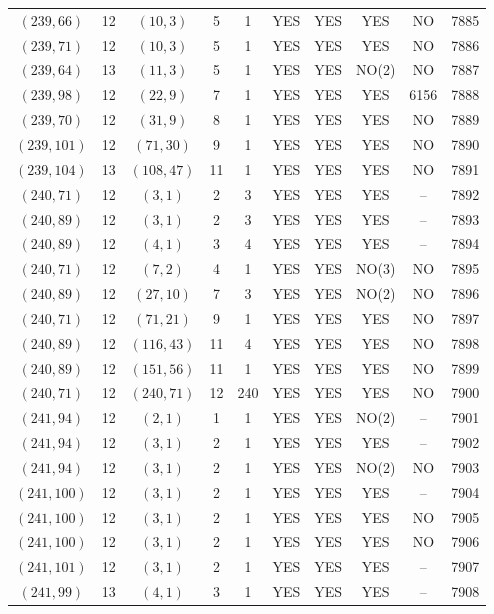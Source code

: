 \begin{longtable}{|c|c|c|c|c|c|c|c|c|c|}
$(239, 66)$ & 12 & $(10, 3)$ & 5 & 1 & YES & YES & YES & NO & 7885\\
$(239, 71)$ & 12 & $(10, 3)$ & 5 & 1 & YES & YES & YES & NO & 7886\\
$(239, 64)$ & 13 & $(11, 3)$ & 5 & 1 & YES & YES & NO(2) & NO & 7887\\
$(239, 98)$ & 12 & $(22, 9)$ & 7 & 1 & YES & YES & YES & 6156 & 7888\\
$(239, 70)$ & 12 & $(31, 9)$ & 8 & 1 & YES & YES & YES & NO & 7889\\
$(239, 101)$ & 12 & $(71, 30)$ & 9 & 1 & YES & YES & YES & NO & 7890\\
$(239, 104)$ & 13 & $(108, 47)$ & 11 & 1 & YES & YES & YES & NO & 7891\\
$(240, 71)$ & 12 & $(3, 1)$ & 2 & 3 & YES & YES & YES & -- & 7892\\
$(240, 89)$ & 12 & $(3, 1)$ & 2 & 3 & YES & YES & YES & -- & 7893\\
$(240, 89)$ & 12 & $(4, 1)$ & 3 & 4 & YES & YES & YES & -- & 7894\\
$(240, 71)$ & 12 & $(7, 2)$ & 4 & 1 & YES & YES & NO(3) & NO & 7895\\
$(240, 89)$ & 12 & $(27, 10)$ & 7 & 3 & YES & YES & NO(2) & NO & 7896\\
$(240, 71)$ & 12 & $(71, 21)$ & 9 & 1 & YES & YES & YES & NO & 7897\\
$(240, 89)$ & 12 & $(116, 43)$ & 11 & 4 & YES & YES & YES & NO & 7898\\
$(240, 89)$ & 12 & $(151, 56)$ & 11 & 1 & YES & YES & YES & NO & 7899\\
$(240, 71)$ & 12 & $(240, 71)$ & 12 & 240 & YES & YES & YES & NO & 7900\\
$(241, 94)$ & 12 & $(2, 1)$ & 1 & 1 & YES & YES & NO(2) & -- & 7901\\
$(241, 94)$ & 12 & $(3, 1)$ & 2 & 1 & YES & YES & YES & -- & 7902\\
$(241, 94)$ & 12 & $(3, 1)$ & 2 & 1 & YES & YES & NO(2) & NO & 7903\\
$(241, 100)$ & 12 & $(3, 1)$ & 2 & 1 & YES & YES & YES & -- & 7904\\
$(241, 100)$ & 12 & $(3, 1)$ & 2 & 1 & YES & YES & YES & NO & 7905\\
$(241, 100)$ & 12 & $(3, 1)$ & 2 & 1 & YES & YES & YES & NO & 7906\\
$(241, 101)$ & 12 & $(3, 1)$ & 2 & 1 & YES & YES & YES & -- & 7907\\
$(241, 99)$ & 13 & $(4, 1)$ & 3 & 1 & YES & YES & YES & -- & 7908\\

\end{longtable}
